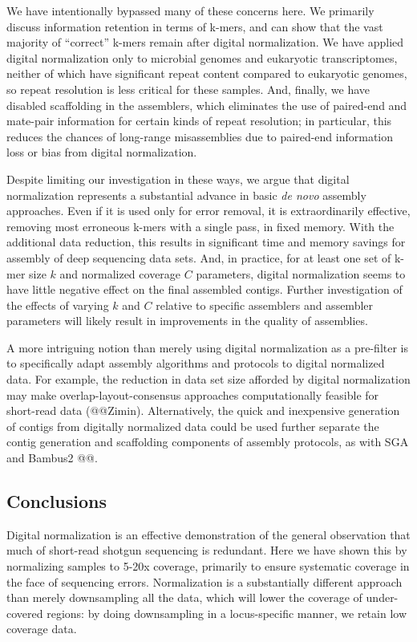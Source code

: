 \documentclass[10pt]{article}
\begin{document}
We have intentionally bypassed many of these concerns here. We
primarily discuss information retention in terms of k-mers, and can
show that the vast majority of ``correct'' k-mers remain after digital
normalization.  We have applied digital normalization only to
microbial genomes and eukaryotic transcriptomes, neither of which have
significant repeat content compared to eukaryotic genomes, so repeat
resolution is less critical for these samples.  And, finally, we have
disabled scaffolding in the assemblers, which eliminates the use of
paired-end and mate-pair information for certain kinds of repeat
resolution; in particular, this reduces the chances of long-range
misassemblies due to paired-end information loss or bias from digital
normalization.

Despite limiting our investigation in these ways, we argue that
digital normalization represents a substantial advance in basic {\em
  de novo} assembly approaches.  Even if it is used only for error
removal, it is extraordinarily effective, removing most erroneous
k-mers with a single pass, in fixed memory.  With the additional data
reduction, this results in significant time and memory savings for
assembly of deep sequencing data sets.  And, in practice, for at least
one set of k-mer size $k$ and normalized coverage $C$ parameters, digital
normalization seems to have little negative effect on the final
assembled contigs.  Further investigation of the effects of varying
$k$ and $C$ relative to specific assemblers and assembler parameters
will likely result in improvements in the quality of assemblies.

A more intriguing notion than merely using digital normalization as a
pre-filter is to specifically adapt assembly algorithms and protocols
to digital normalized data.  For example, the reduction in data set
size afforded by digital normalization may make
overlap-layout-consensus approaches computationally feasible for
short-read data (@@Zimin).  Alternatively, the quick and inexpensive
generation of contigs from digitally normalized data could be used
further separate the contig generation and scaffolding components of
assembly protocols, as with SGA and Bambus2 @@.

\subsection*{Conclusions}

Digital normalization is an effective demonstration of the general
observation that much of short-read shotgun sequencing is redundant.
Here we have shown this by normalizing samples to 5-20x coverage,
primarily to ensure systematic coverage in the face of sequencing
errors.  Normalization is a substantially different approach than
merely downsampling all the data, which will lower the coverage of
under-covered regions: by doing downsampling in a locus-specific
manner, we retain low coverage data.
\end{document}

